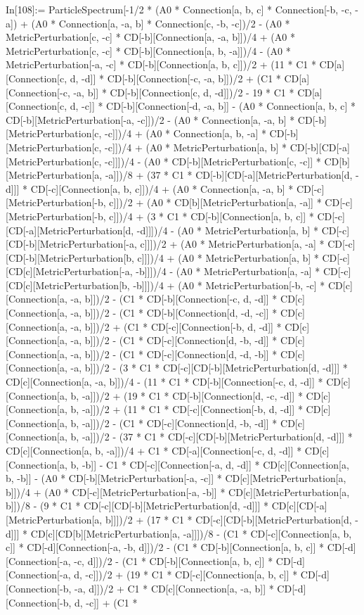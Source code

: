 In[108]:= ParticleSpectrum[-1/2 * (A0 * Connection[a, b, c] * Connection[-b, -c, -a]) + (A0 * Connection[a, -a, b] * Connection[c, -b, -c])/2 - (A0 * MetricPerturbation[c, -c] * CD[-b][Connection[a, -a, b]])/4 + (A0 * MetricPerturbation[c, -c] * CD[-b][Connection[a, b, -a]])/4 - (A0 * MetricPerturbation[-a, -c] * CD[-b][Connection[a, b, c]])/2 + (11 * C1 * CD[a][Connection[c, d, -d]] * CD[-b][Connection[-c, -a, b]])/2 + (C1 * CD[a][Connection[-c, -a, b]] * CD[-b][Connection[c, d, -d]])/2 - 19 * C1 * CD[a][Connection[c, d, -c]] * CD[-b][Connection[-d, -a, b]] - (A0 * Connection[a, b, c] * CD[-b][MetricPerturbation[-a, -c]])/2 - (A0 * Connection[a, -a, b] * CD[-b][MetricPerturbation[c, -c]])/4 + (A0 * Connection[a, b, -a] * CD[-b][MetricPerturbation[c, -c]])/4 + (A0 * MetricPerturbation[a, b] * CD[-b][CD[-a][MetricPerturbation[c, -c]]])/4 - (A0 * CD[-b][MetricPerturbation[c, -c]] * CD[b][MetricPerturbation[a, -a]])/8 + (37 * C1 * CD[-b][CD[-a][MetricPerturbation[d, -d]]] * CD[-c][Connection[a, b, c]])/4 + (A0 * Connection[a, -a, b] * CD[-c][MetricPerturbation[-b, c]])/2 + (A0 * CD[b][MetricPerturbation[a, -a]] * CD[-c][MetricPerturbation[-b, c]])/4 + (3 * C1 * CD[-b][Connection[a, b, c]] * CD[-c][CD[-a][MetricPerturbation[d, -d]]])/4 - (A0 * MetricPerturbation[a, b] * CD[-c][CD[-b][MetricPerturbation[-a, c]]])/2 + (A0 * MetricPerturbation[a, -a] * CD[-c][CD[-b][MetricPerturbation[b, c]]])/4 + (A0 * MetricPerturbation[a, b] * CD[-c][CD[c][MetricPerturbation[-a, -b]]])/4 - (A0 * MetricPerturbation[a, -a] * CD[-c][CD[c][MetricPerturbation[b, -b]]])/4 + (A0 * MetricPerturbation[-b, -c] * CD[c][Connection[a, -a, b]])/2 - (C1 * CD[-b][Connection[-c, d, -d]] * CD[c][Connection[a, -a, b]])/2 - (C1 * CD[-b][Connection[d, -d, -c]] * CD[c][Connection[a, -a, b]])/2 + (C1 * CD[-c][Connection[-b, d, -d]] * CD[c][Connection[a, -a, b]])/2 - (C1 * CD[-c][Connection[d, -b, -d]] * CD[c][Connection[a, -a, b]])/2 - (C1 * CD[-c][Connection[d, -d, -b]] * CD[c][Connection[a, -a, b]])/2 - (3 * C1 * CD[-c][CD[-b][MetricPerturbation[d, -d]]] * CD[c][Connection[a, -a, b]])/4 - (11 * C1 * CD[-b][Connection[-c, d, -d]] * CD[c][Connection[a, b, -a]])/2 + (19 * C1 * CD[-b][Connection[d, -c, -d]] * CD[c][Connection[a, b, -a]])/2 + (11 * C1 * CD[-c][Connection[-b, d, -d]] * CD[c][Connection[a, b, -a]])/2 - (C1 * CD[-c][Connection[d, -b, -d]] * CD[c][Connection[a, b, -a]])/2 - (37 * C1 * CD[-c][CD[-b][MetricPerturbation[d, -d]]] * CD[c][Connection[a, b, -a]])/4 + C1 * CD[-a][Connection[-c, d, -d]] * CD[c][Connection[a, b, -b]] - C1 * CD[-c][Connection[-a, d, -d]] * CD[c][Connection[a, b, -b]] - (A0 * CD[-b][MetricPerturbation[-a, -c]] * CD[c][MetricPerturbation[a, b]])/4 + (A0 * CD[-c][MetricPerturbation[-a, -b]] * CD[c][MetricPerturbation[a, b]])/8 - (9 * C1 * CD[-c][CD[-b][MetricPerturbation[d, -d]]] * CD[c][CD[-a][MetricPerturbation[a, b]]])/2 + (17 * C1 * CD[-c][CD[-b][MetricPerturbation[d, -d]]] * CD[c][CD[b][MetricPerturbation[a, -a]]])/8 - (C1 * CD[-c][Connection[a, b, c]] * CD[-d][Connection[-a, -b, d]])/2 - (C1 * CD[-b][Connection[a, b, c]] * CD[-d][Connection[-a, -c, d]])/2 - (C1 * CD[-b][Connection[a, b, c]] * CD[-d][Connection[-a, d, -c]])/2 + (19 * C1 * CD[-c][Connection[a, b, c]] * CD[-d][Connection[-b, -a, d]])/2 + C1 * CD[c][Connection[a, -a, b]] * CD[-d][Connection[-b, d, -c]] + (C1 * 